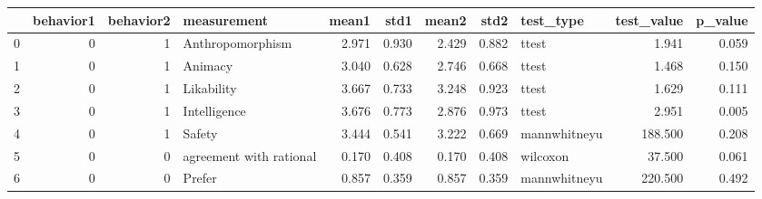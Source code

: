 \begin{tabular}{lrrlrrrrlrr}
\toprule
{} &  behavior1 &  behavior2 &              measurement &  mean1 &   std1 &  mean2 &   std2 &     test\_type &  test\_value &  p\_value \\
\midrule
0 &          0 &          1 &         Anthropomorphism &  2.971 &  0.930 &  2.429 &  0.882 &         ttest &       1.941 &    0.059 \\
1 &          0 &          1 &                  Animacy &  3.040 &  0.628 &  2.746 &  0.668 &         ttest &       1.468 &    0.150 \\
2 &          0 &          1 &               Likability &  3.667 &  0.733 &  3.248 &  0.923 &         ttest &       1.629 &    0.111 \\
3 &          0 &          1 &             Intelligence &  3.676 &  0.773 &  2.876 &  0.973 &         ttest &       2.951 &    0.005 \\
4 &          0 &          1 &                   Safety &  3.444 &  0.541 &  3.222 &  0.669 &  mannwhitneyu &     188.500 &    0.208 \\
5 &          0 &          0 &  agreement with rational &  0.170 &  0.408 &  0.170 &  0.408 &      wilcoxon &      37.500 &    0.061 \\
6 &          0 &          0 &                   Prefer &  0.857 &  0.359 &  0.857 &  0.359 &  mannwhitneyu &     220.500 &    0.492 \\
\bottomrule
\end{tabular}
